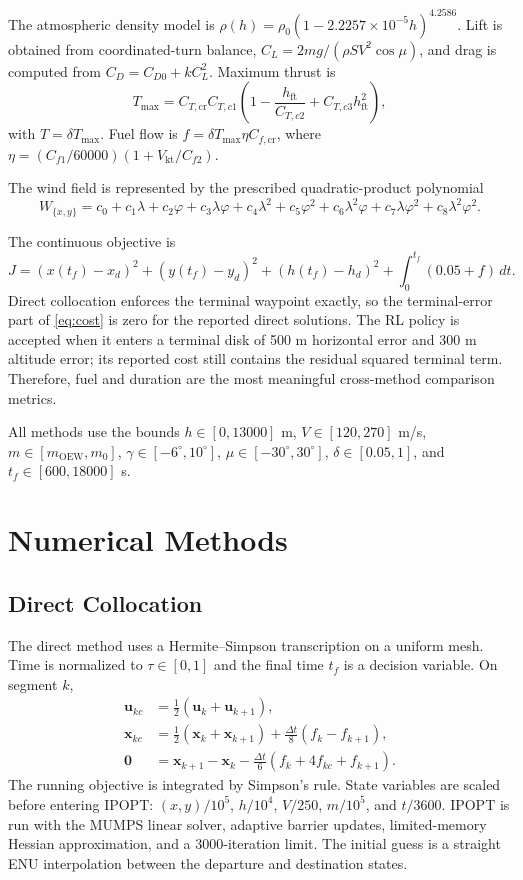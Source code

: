 \documentclass[11pt,a4paper]{article}
\begin{document}
The atmospheric density model is
$\rho(h)=\rho_0(1-2.2257\times10^{-5}h)^{4.2586}$. Lift is obtained
from coordinated-turn balance,
$C_L=2mg/(\rho S V^2\cos\mu)$, and drag is computed from
$C_D=C_{D0}+kC_L^2$. Maximum thrust is
\[
T_{\max}=C_{T,\mathrm{cr}}C_{T,c1}
\left(1-\frac{h_{\mathrm{ft}}}{C_{T,c2}}
      +C_{T,c3}h_{\mathrm{ft}}^2\right),
\]
with $T=\delta T_{\max}$. Fuel flow is
$f=\delta T_{\max}\eta C_{f,\mathrm{cr}}$, where
$\eta=(C_{f1}/60000)(1+V_{\mathrm{kt}}/C_{f2})$.

The wind field is represented by the prescribed quadratic-product
polynomial
\[
W_{\{x,y\}}=c_0+c_1\lambda+c_2\varphi+c_3\lambda\varphi
+c_4\lambda^2+c_5\varphi^2+c_6\lambda^2\varphi
+c_7\lambda\varphi^2+c_8\lambda^2\varphi^2 .
\]

The continuous objective is
\begin{equation}
J=(x(t_f)-x_d)^2+(y(t_f)-y_d)^2+(h(t_f)-h_d)^2
  +\int_0^{t_f}(0.05+f)\,dt .
\label{eq:cost}
\end{equation}
Direct collocation enforces the terminal waypoint exactly, so the
terminal-error part of \eqref{eq:cost} is zero for the reported direct
solutions. The RL policy is accepted when it enters a terminal disk of
500 m horizontal error and 300 m altitude error; its reported cost still
contains the residual squared terminal term. Therefore, fuel and
duration are the most meaningful cross-method comparison metrics.

All methods use the bounds $h\in[0,13000]$ m, $V\in[120,270]$ m/s,
$m\in[m_{\mathrm{OEW}},m_0]$, $\gamma\in[-6^\circ,10^\circ]$,
$\mu\in[-30^\circ,30^\circ]$, $\delta\in[0.05,1]$, and
$t_f\in[600,18000]$ s.

\section{Numerical Methods}
\subsection{Direct Collocation}
The direct method uses a Hermite--Simpson transcription on a uniform
mesh. Time is normalized to $\tau\in[0,1]$ and the final time $t_f$ is a
decision variable. On segment $k$,
\begin{align*}
\mathbf{u}_{kc} &= \tfrac12(\mathbf{u}_k+\mathbf{u}_{k+1}),\\
\mathbf{x}_{kc} &= \tfrac12(\mathbf{x}_k+\mathbf{x}_{k+1})
 +\tfrac{\Delta t}{8}(f_k-f_{k+1}),\\
\mathbf{0} &= \mathbf{x}_{k+1}-\mathbf{x}_k
 -\tfrac{\Delta t}{6}(f_k+4f_{kc}+f_{k+1}).
\end{align*}
The running objective is integrated by Simpson's rule. State variables
are scaled before entering IPOPT: $(x,y)/10^5$, $h/10^4$, $V/250$,
$m/10^5$, and $t/3600$. IPOPT is run with the MUMPS linear solver,
adaptive barrier updates, limited-memory Hessian approximation, and a
3000-iteration limit. The initial guess is a straight ENU interpolation
between the departure and destination states.
\end{document}
